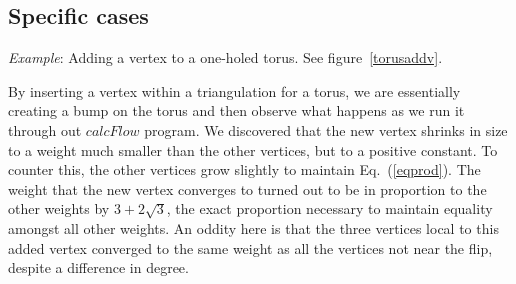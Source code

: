 \documentclass[12pt]{article}
\begin{document}
\subsection{Specific cases}

\noindent \textit{Example}: Adding a vertex to a one-holed torus. See figure~\ref{torusaddv}. \newline

\noindent By inserting a vertex within a triangulation for a torus, we are essentially creating a bump on the torus and then observe what happens as we run it through out $calcFlow$ program. We discovered that the new vertex shrinks in size to a weight much smaller than the other vertices, but to a positive constant. To counter this, the other vertices grow slightly to maintain Eq.~(\ref{eqprod}). The weight that the new vertex converges to turned out to be in proportion to the other weights by $3+2\sqrt{3}$, the exact proportion necessary to maintain equality amongst all other weights. An oddity here is that the three vertices local to this added vertex converged to the same weight as all the vertices not near the flip, despite a difference in degree.\newline
\end{document}
